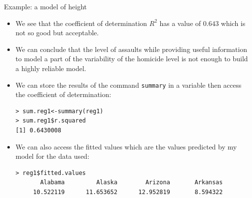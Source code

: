 \documentclass[handout]{beamer}
\begin{document}
\begin{frame}[fragile]{Example: a model of height}
\scriptsize{
\begin{itemize}
 \item We see that the coefficient of determination $R^2$ has a value of $0.643$ which is not so good but acceptable.
 
 
  \item We can conclude that the level of assaults while providing useful information to model a part of the variability of the homicide level is not enough to build a highly reliable model. 
  
  \item We can store the results of the command \verb+summary+ in a variable then access the coefficient of determination:
\begin{verbatim}
> sum.reg1<-summary(reg1)
> sum.reg1$r.squared
[1] 0.6430008   
\end{verbatim}

\item  We can also access the fitted values which are the values predicted by my model for the data used:
\begin{verbatim}
> reg1$fitted.values
       Alabama         Alaska        Arizona       Arkansas        
     10.522119      11.653652      12.952819       8.594322      
\end{verbatim}
 
 \end{itemize}
 

} 
\end{frame}
\end{document}
